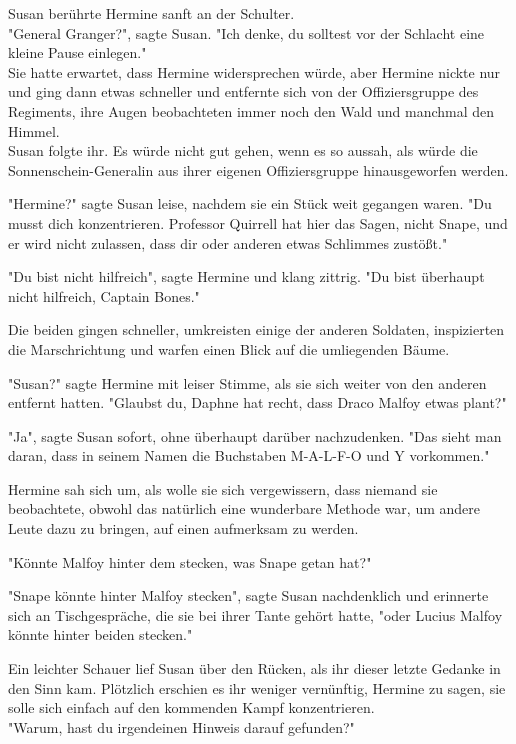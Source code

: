 {Susan berührte Hermine sanft an der Schulter.\\ "General Granger?", sagte Susan. "Ich denke, du solltest vor der Schlacht eine kleine Pause einlegen."\\ Sie hatte erwartet, dass Hermine widersprechen würde, aber Hermine nickte nur und ging dann etwas schneller und entfernte sich von der Offiziersgruppe des Regiments, ihre Augen beobachteten immer noch den Wald und manchmal den Himmel.\\ Susan folgte ihr. Es würde nicht gut gehen, wenn es so aussah, als würde die Sonnenschein-Generalin aus ihrer eigenen Offiziersgruppe hinausgeworfen werden.

"Hermine?" sagte Susan leise, nachdem sie ein Stück weit gegangen waren. "Du musst dich konzentrieren. Professor Quirrell hat hier das Sagen, nicht Snape, und er wird nicht zulassen, dass dir oder anderen etwas Schlimmes zustößt."

"Du bist nicht hilfreich", sagte Hermine und klang zittrig. "Du bist überhaupt nicht hilfreich, Captain Bones."

Die beiden gingen schneller, umkreisten einige der anderen Soldaten, inspizierten die Marschrichtung und warfen einen Blick auf die umliegenden Bäume.

"Susan?" sagte Hermine mit leiser Stimme, als sie sich weiter von den anderen entfernt hatten. "Glaubst du, Daphne hat recht, dass Draco Malfoy etwas plant?"

"Ja", sagte Susan sofort, ohne überhaupt darüber nachzudenken. "Das sieht man daran, dass in seinem Namen die Buchstaben M-A-L-F-O und Y vorkommen."

Hermine sah sich um, als wolle sie sich vergewissern, dass niemand sie beobachtete, obwohl das natürlich eine wunderbare Methode war, um andere Leute dazu zu bringen, auf einen aufmerksam zu werden.

"Könnte Malfoy hinter dem stecken, was Snape getan hat?"

"Snape könnte hinter Malfoy stecken", sagte Susan nachdenklich und erinnerte sich an Tischgespräche, die sie bei ihrer Tante gehört hatte, "oder Lucius Malfoy könnte hinter beiden stecken."

Ein leichter Schauer lief Susan über den Rücken, als ihr dieser letzte Gedanke in den Sinn kam. Plötzlich erschien es ihr weniger vernünftig, Hermine zu sagen, sie solle sich einfach auf den kommenden Kampf konzentrieren.\\ "Warum, hast du irgendeinen Hinweis darauf gefunden?"

}
